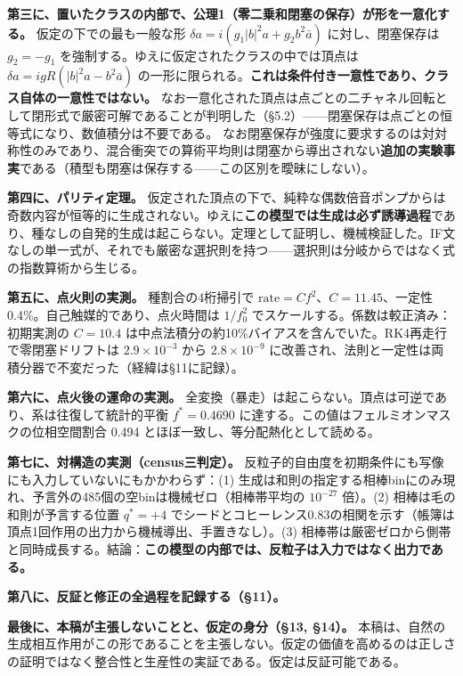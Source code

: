 \documentclass[
  a4paper,
]{ltjsarticle}
\begin{document}
\textbf{第三に、置いたクラスの内部で、公理1（零二乗和閉塞の保存）が形を一意化する。}
仮定の下での最も一般な形 \(\delta a = i(g_1|b|^2 a + g_2 b^2\bar a)\)
に対し、閉塞保存は \(g_2=-g_1\)
を強制する。ゆえに仮定されたクラスの中では頂点は
\(\delta a = igR(|b|^2 a - b^2\bar a)\)
の一形に限られる。\textbf{これは条件付き一意性であり、クラス自体の一意性ではない。}
なお一意化された頂点は点ごとの二チャネル回転として閉形式で厳密可解であることが判明した（§5.2）------閉塞保存は点ごとの恒等式になり、数値積分は不要である。
なお閉塞保存が強度に要求するのは対対称性のみであり、混合衝突での算術平均則は閉塞から導出されない\textbf{追加の実験事実}である（積型も閉塞は保存する------この区別を曖昧にしない）。

\textbf{第四に、パリティ定理。}
仮定された頂点の下で、純粋な偶数倍音ポンプからは奇数内容が恒等的に生成されない。ゆえに\textbf{この模型では生成は必ず誘導過程}であり、種なしの自発的生成は起こらない。定理として証明し、機械検証した。IF文なしの単一式が、それでも厳密な選択則を持つ------選択則は分岐からではなく式の指数算術から生じる。

\textbf{第五に、点火則の実測。} 種割合の4桁掃引で
\(\mathrm{rate} = C f^2\)、\(C = 11.45\)、一定性0.4\%。自己触媒的であり、点火時間は
\(1/f_0^2\) でスケールする。係数は較正済み：初期実測の \(C=10.4\)
は中点法積分の約10\%バイアスを含んでいた。RK4再走行で零閉塞ドリフトは
\(2.9\times10^{-3}\) から \(2.8\times10^{-9}\)
に改善され、法則と一定性は両積分器で不変だった（経緯は§11に記録）。

\textbf{第六に、点火後の運命の実測。}
全変換（暴走）は起こらない。頂点は可逆であり、系は往復して統計的平衡
\(f^* = 0.4690\) に達する。この値はフェルミオンマスクの位相空間割合
0.494 とほぼ一致し、等分配熱化として読める。

\textbf{第七に、対構造の実測（census三判定）。}
反粒子的自由度を初期条件にも写像にも入力していないにもかかわらず：(1)
生成は和則の指定する相棒binにのみ現れ、予言外の485個の空binは機械ゼロ（相棒帯平均の
\(10^{-27}\) 倍）。(2) 相棒は毛の和則が予言する位置 \(q^*=+4\)
でシードとコヒーレンス0.83の相関を示す（帳簿は頂点1回作用の出力から機械導出、手置きなし）。(3)
相棒帯は厳密ゼロから側帯と同時成長する。結論：\textbf{この模型の内部では、反粒子は入力ではなく出力である。}

\textbf{第八に、反証と修正の全過程を記録する（§11）。}

\textbf{最後に、本稿が主張しないことと、仮定の身分（§13, §14）。}
本稿は、自然の生成相互作用がこの形であることを主張しない。仮定の価値を高めるのは正しさの証明ではなく整合性と生産性の実証である。仮定は反証可能である。
\end{document}
